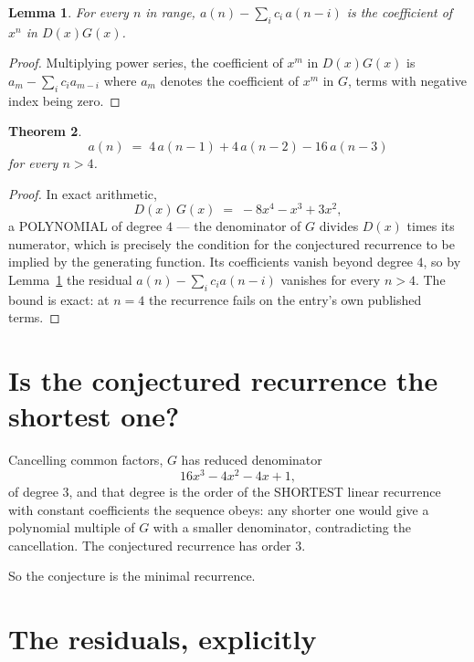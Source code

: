 \documentclass[11pt,a4paper]{article}
\theoremstyle{plain}
\newtheorem{theorem}{Theorem}
\newtheorem{lemma}[theorem]{Lemma}
\theoremstyle{definition}
\begin{document}
\begin{lemma}\label{lem:key}
For every $n$ in range, $a(n)-\sum_i c_i\,a(n-i)$ is the coefficient of $x^{n}$ in
$D(x)G(x)$.
\end{lemma}

\begin{proof}
Multiplying power series, the coefficient of $x^{m}$ in $D(x)G(x)$ is
$a_m-\sum_i c_i a_{m-i}$ where $a_m$ denotes the coefficient of $x^{m}$ in $G$, terms with
negative index being zero.
\end{proof}

\begin{theorem}
\[
a(n)\;=\;4\,a(n-1) + 4\,a(n-2) - 16\,a(n-3)
\]
for every $n>4$.
\end{theorem}

\begin{proof}
In exact arithmetic,
\[
D(x)\,G(x)\;=\;- 8 x^{4} - x^{3} + 3 x^{2},
\]
a POLYNOMIAL of degree $4$ --- the denominator of $G$ divides $D(x)$ times its numerator,
which is precisely the condition for the conjectured recurrence to be implied by the
generating function. Its coefficients vanish beyond degree $4$, so by
Lemma~\ref{lem:key} the residual $a(n)-\sum_ic_ia(n-i)$ vanishes for every
$n>4$. The bound is exact: at $n=4$ the recurrence fails on the entry's own published terms.
\end{proof}

\section{Is the conjectured recurrence the shortest one?}

Cancelling common factors, $G$ has reduced denominator
\[
16 x^{3} - 4 x^{2} - 4 x + 1,
\]
of degree $3$, and that degree is the order of the SHORTEST linear recurrence with
constant coefficients the sequence obeys: any shorter one would give a polynomial multiple of
$G$ with a smaller denominator, contradicting the cancellation. The conjectured recurrence has
order $3$.

So the conjecture is the minimal recurrence.

\section{The residuals, explicitly}
\end{document}
